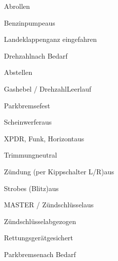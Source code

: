 \begin{checklist}{Abrollen}
	\item{Benzinpumpe}{aus}
	\item{Landeklappen}{ganz eingefahren}
	\item{Drehzahl}{nach Bedarf}
\end{checklist}

\begin{checklist}{Abstellen}
	  \item{Gashebel / Drehzahl}{Leerlauf}
	  \item{Parkbremse}{fest}
	  \item{Scheinwerfer}{aus}
	  \item{XPDR, Funk, Horizont}{aus}
	  \item{Trimmung}{neutral}
	  \item{Zündung (per Kippschalter L/R)}{aus}
	  
	  \item{Strobes (Blitz)}{aus}
	  \item{MASTER / Zündschlüssel}{aus}
	  \item{Zündschlüssel}{abgezogen}
	  \item{Rettungsgerät}{gesichert}
	  
	  \item{Parkbremse}{nach Bedarf}
\end{checklist}


